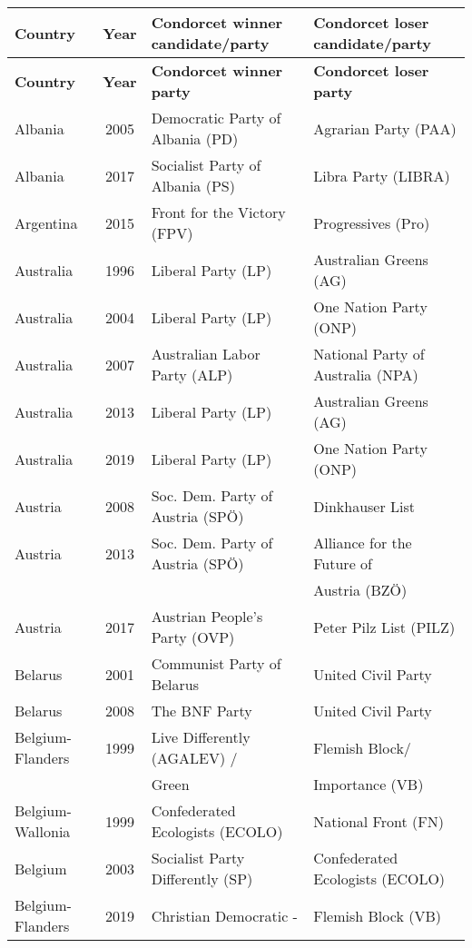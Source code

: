 \scriptsize{
\begin{longtable}{|l|c|l|l|}  \toprule 
	\textbf{Country} & \textbf{Year} & \textbf{Condorcet winner candidate/party} & \textbf{Condorcet loser candidate/party} \\ \midrule 	\endfirsthead	\midrule
\textbf{Country} & \textbf{Year} & \textbf{Condorcet winner party} & \textbf{Condorcet loser party} \\		\midrule \endhead \midrule \endfoot \bottomrule
\endlastfoot \midrule
Albania & 2005 &   Democratic Party of Albania (PD) &   Agrarian Party (PAA) \\ 
Albania & 2017 &   Socialist Party of Albania (PS) &   Libra Party (LIBRA) \\ 
%
Argentina & 2015 &   Front for the Victory (FPV) &   Progressives (Pro) \\ 
%
Australia & 1996 &   Liberal Party (LP) &    Australian Greens (AG) \\ 
Australia & 2004 &   Liberal Party (LP) &   One Nation Party (ONP) \\ 
Australia & 2007 &   Australian Labor Party (ALP)  &   National Party of Australia (NPA)      \\ 
Australia & 2013 &   Liberal Party (LP) &   Australian Greens (AG) \\ 
Australia & 2019 &   Liberal Party (LP) &   One Nation Party (ONP) \\ 
%
Austria & 2008 &   Soc. Dem. Party of Austria (SPÖ) &   Dinkhauser List  \\ 
Austria & 2013 &   Soc. Dem. Party of Austria (SPÖ) &   Alliance for the Future of   \\ 
    &  &   &     Austria (BZÖ) \\ 
Austria & 2017 &   Austrian People's Party (OVP)   &   Peter Pilz List (PILZ) \\ 
%
Belarus & 2001 &   Communist Party of Belarus  &   United Civil Party  \\ 
Belarus & 2008 &   The BNF Party  &   United Civil Party  \\  
%
Belgium-Flanders & 1999 & Live Differently (AGALEV)  /  &  Flemish Block/ \\ 
   &   &   Green  &   Importance (VB)\\ 
Belgium-Wallonia & 1999 & Confederated Ecologists (ECOLO)   &  National Front (FN)   \\ 
  Belgium & 2003 &   Socialist Party Differently (SP)   &   Confederated Ecologists (ECOLO)   \\ 
Belgium-Flanders & 2019 & Christian Democratic -   &  Flemish Block  (VB)\\ 

\end{longtable}}
